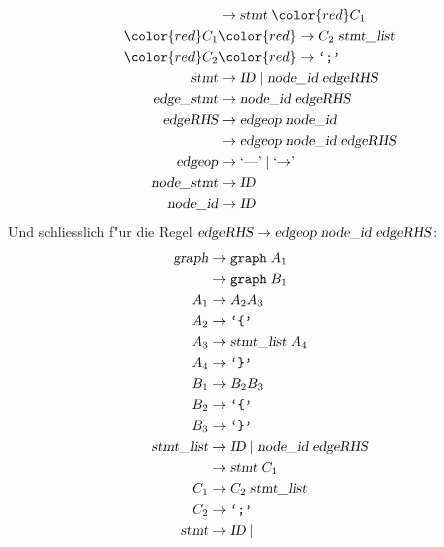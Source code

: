 \begin{loesung}
\begin{teilaufgaben}
\begin{align*}
                   &\rightarrow \textsl{stmt}\; \color{red}C_1\\
\color{red}C_1     &\color{red}\rightarrow C_2\;\textsl{stmt\_list}\\
\color{red}C_2     &\color{red}\rightarrow \texttt{`;'} \\
\textsl{stmt}      &\rightarrow \textsl{ID}\; |\;
                                \textsl{node\_id}\; \textsl{edgeRHS} \\
\textsl{edge\_stmt}&\rightarrow \textsl{node\_id}\; \textsl{edgeRHS} \\
\textsl{edgeRHS}   &\rightarrow \textsl{edgeop}\; \textsl{node\_id}\\
                   &\rightarrow \textsl{edgeop}\; \textsl{node\_id}\; \textsl{edgeRHS}\\
\textsl{edgeop}    &\rightarrow \textrm{`\text{---}'}\; |\; \textrm{`$\rightarrow$'}\; \\
\textsl{node\_stmt}&\rightarrow \textsl{ID} \\
\textsl{node\_id}  &\rightarrow \textsl{ID}
\end{align*}
Und schliesslich f"ur die Regel 
$\textsl{edgeRHS}   \rightarrow \textsl{edgeop}\; \textsl{node\_id}\; \textsl{edgeRHS}$:
\begin{align*}
\textsl{graph}     &\rightarrow \texttt{graph}\; A_1 \\
                   &\rightarrow \texttt{graph}\; B_1 \\
A_1                &\rightarrow A_2A_3\\
A_2                &\rightarrow \texttt{`\{'}\\
A_3                &\rightarrow \textsl{stmt\_list}\;A_4\\
A_4                &\rightarrow \texttt{`\}'}\\
B_1                &\rightarrow B_2B_3\\
B_2                &\rightarrow \texttt{`\{'}\\
B_3                &\rightarrow \texttt{`\}'}\\
\textsl{stmt\_list}&\rightarrow \textsl{ID}\; |\;
                                \textsl{node\_id}\; \textsl{edgeRHS} \\
                   &\rightarrow \textsl{stmt}\; C_1\\
C_1                &\rightarrow C_2\;\textsl{stmt\_list}\\
C_2                &\rightarrow \texttt{`;'} \\
\textsl{stmt}      &\rightarrow \textsl{ID}\; |\;

\end{align*}
\end{teilaufgaben}
\end{loesung}
